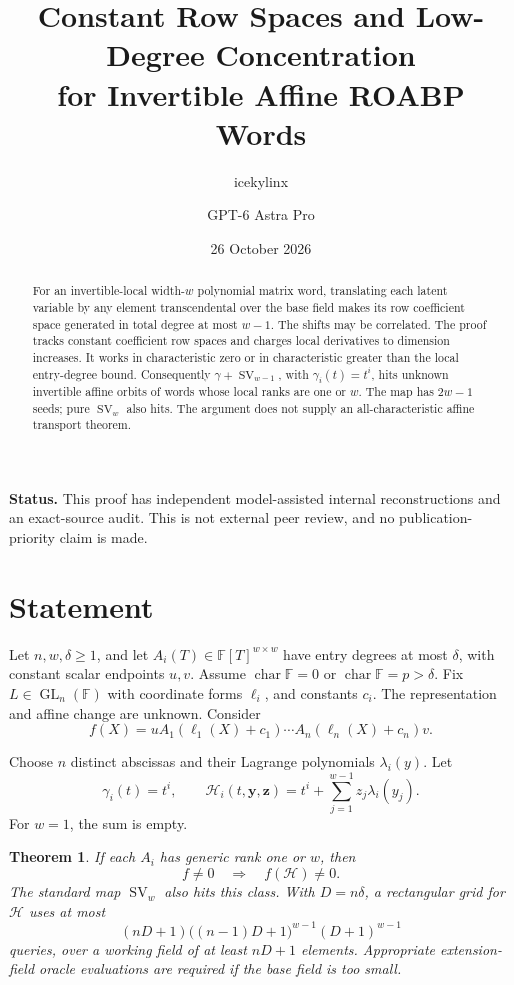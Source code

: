 \documentclass[11pt]{article}
\title{Constant Row Spaces and Low-Degree Concentration\\
for Invertible Affine ROABP Words}
\author{icekylinx \and GPT-6 Astra Pro}\date{26 October 2026}
\newtheorem{theorem}{Theorem}[section]
\newcommand{\F}{\mathbb F}
\newcommand{\SV}{\operatorname{SV}}
\newcommand{\GL}{\operatorname{GL}}
\begin{document}
\maketitle
\begin{abstract}
For an invertible-local width-\(w\) polynomial matrix word, translating
each latent variable by any element transcendental over the base field
makes its row coefficient space generated in total degree at most
\(w-1\). The shifts may be correlated.
The proof tracks constant coefficient row spaces and charges local
derivatives to dimension increases. It works in characteristic zero
or in characteristic greater than the local entry-degree bound.
Consequently \(\gamma+\SV_{w-1}\), with \(\gamma_i(t)=t^i\),
hits unknown invertible affine orbits of words whose local ranks
are one or \(w\). The map has \(2w-1\) seeds; pure \(\SV_w\)
also hits. The argument does not supply an all-characteristic
affine transport theorem.
\end{abstract}

\noindent\textbf{Status.}
This proof has independent model-assisted internal reconstructions
and an exact-source audit. This is not external peer review,
and no publication-priority claim is made.

\section{Statement}

Let \(n,w,\delta\ge1\), and let
\(A_i(T)\in\F[T]^{w\times w}\) have entry degrees at most
\(\delta\), with constant scalar endpoints \(u,v\).
Assume \(\operatorname{char}\F=0\) or
\(\operatorname{char}\F=p>\delta\).
Fix \(L\in\GL_n(\F)\) with coordinate forms \(\ell_i\), and
constants \(c_i\). The representation and affine change are unknown.
Consider
\[
 f(X)=uA_1(\ell_1(X)+c_1)\cdots A_n(\ell_n(X)+c_n)v.
\]

Choose \(n\) distinct abscissas and their Lagrange polynomials
\(\lambda_i(y)\). Let
\[
 \gamma_i(t)=t^i,\qquad
 \mathcal H_i(t,\boldsymbol y,\boldsymbol z)
  =t^i+\sum_{j=1}^{w-1}z_j\lambda_i(y_j).
\]
For \(w=1\), the sum is empty.

\begin{theorem}\label{thm:hit}
If each \(A_i\) has generic rank one or \(w\), then
\[
 f\ne0\quad\Longrightarrow\quad f(\mathcal H)\ne0.
\]
The standard map \(\SV_w\) also hits this class.
With \(D=n\delta\), a rectangular grid for \(\mathcal H\)
uses at most
\[
 (nD+1)\bigl((n-1)D+1\bigr)^{w-1}(D+1)^{w-1}
\]
queries, over a working field of at least \(nD+1\) elements.
Appropriate extension-field oracle evaluations are required if
the base field is too small.
\end{theorem}
\end{document}
